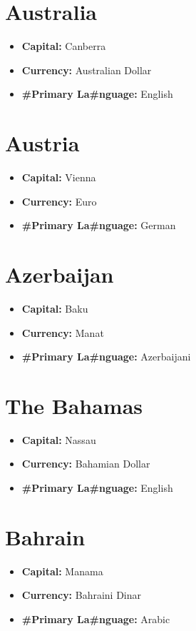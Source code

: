 \documentclass[a4paper,twoside]{book}
\begin{document}
\section*{\Huge Australia}
\vspace{5mm} %
\begin{itemize}
	\item \textbf{Capital:} Canberra
	\item \textbf{Currency:} Australian Dollar
	\item \textbf{\#Primary La\#nguage:} English
\end{itemize}

\section*{\Huge Austria}
\vspace{5mm} %
\begin{itemize}
	\item \textbf{Capital:} Vienna
	\item \textbf{Currency:} Euro
	\item \textbf{\#Primary La\#nguage:} German
\end{itemize}

\section*{\Huge Azerbaijan}
\vspace{5mm} %
\begin{itemize}
	\item \textbf{Capital:} Baku
	\item \textbf{Currency:} Manat
	\item \textbf{\#Primary La\#nguage:} Azerbaijani
\end{itemize}

\section*{\Huge The Bahamas}
\vspace{5mm} %
\begin{itemize}
	\item \textbf{Capital:} Nassau
	\item \textbf{Currency:} Bahamian Dollar
	\item \textbf{\#Primary La\#nguage:} English
\end{itemize}

\section*{\Huge Bahrain}
\vspace{5mm} %
\begin{itemize}
	\item \textbf{Capital:} Manama
	\item \textbf{Currency:} Bahraini Dinar
	\item \textbf{\#Primary La\#nguage:} Arabic
\end{itemize}
\end{document}
